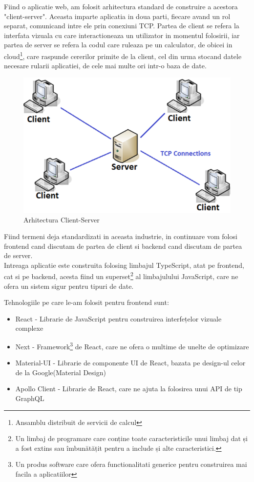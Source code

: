 \documentclass[12pt, a4paper, oneside, romanian]{teza-upb}
\begin{document}
Fiind o aplicatie web, am folosit arhitectura standard de construire a acestora "client-server". Aceasta imparte aplicatia in doua parti, fiecare avand un rol separat, comunicand intre ele prin conexiuni TCP. Partea de client se refera la interfata vizuala cu care interactioneaza un utilizator in momentul folosirii, iar partea de server se refera la codul care ruleaza pe un calculator, de obicei in cloud\footnote{Ansamblu distribuit de servicii de calcul}, care raspunde cererilor primite de la client, cel din urma stocand datele necesare rularii aplicatiei, de cele mai multe ori intr-o baza de date.

\begin{figure}[H]
\centering
\includegraphics*[width=0.7\columnwidth]{arhitectura-client-server}
\caption{Arhitectura Client-Server\cite{clientserverarchitecture}}
\label{arhitectura-client-server}
\end{figure}

Fiind termeni deja standardizati in aceasta industrie, in continuare vom folosi frontend cand discutam de partea de client si backend cand discutam de partea de server. \\

Intreaga aplicatie este construita folosing limbajul TypeScript, atat pe frontend, cat si pe backend, acesta fiind un superset\footnote{Un limbaj de programare care conține toate caracteristicile unui limbaj dat și a fost extins sau îmbunătățit pentru a include și alte caracteristici.} al limbajulului JavaScript, care ne ofera un sistem sigur pentru tipuri de date.

Tehnologiile pe care le-am folosit pentru frontend sunt:
\begin{itemize}
	\item React - Librarie de JavaScript pentru construirea interfețelor vizuale complexe
	\item Next - Framework\footnote{Un produs software care ofera functionalitati generice pentru construirea mai facila a aplicatiilor} de React, care ne ofera o multime de unelte de optimizare
	\item Material-UI - Librarie de componente UI de React, bazata pe design-ul celor de la Google(Material Design)
	\item Apollo Client - Librarie de React, care ne ajuta la folosirea unui API de tip GraphQL
\end{itemize}
\end{document}
